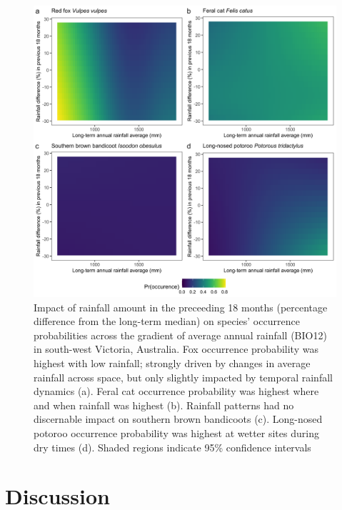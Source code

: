 \documentclass[11pt,a4paper,titlepage,twoside,openright]{style/unimelbthesis}
\begin{document}
\begin{mainmatter}
\(~\)

\(~\)

\(~\)
\begin{figure}

{\centering \includegraphics[width=1\linewidth]{figure/c1/rainfall} 

}

\caption{Impact of rainfall amount in the preceeding 18 months (percentage difference from the long-term median) on species' occurrence probabilities across the gradient of average annual rainfall (BIO12) in south-west Victoria, Australia. Fox occurrence probability was highest with low rainfall; strongly driven by changes in average rainfall across space, but only slightly impacted by temporal rainfall dynamics (a). Feral cat occurrence probability was highest where and when rainfall was highest (b). Rainfall patterns had no discernable impact on southern brown bandicoots (c). Long-nosed potoroo occurrence probability was highest at wetter sites during dry times (d). Shaded regions indicate 95\% confidence intervals}\label{fig:occ-rain}
\end{figure}
\newpage

\hypertarget{discussion}{%
\section{Discussion}\label{discussion}}


\end{mainmatter}
\end{document}
